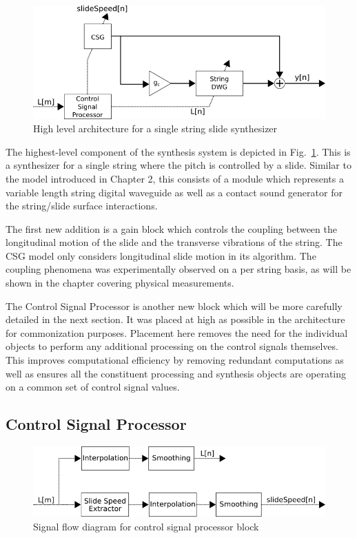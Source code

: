 \documentclass[../main.tex]{subfiles}
\begin{document}
\begin{figure}[h]
    \centering
    \includegraphics[scale=.65]{./images/diagrams/slideSynth.png}
    \caption{High level architecture for a single string slide synthesizer}
    \label{fig:slide_synth}
\end{figure}

The highest-level component of the synthesis system is depicted in Fig.~\ref{fig:slide_synth}. This is a synthesizer for a single string where the pitch is controlled by a slide. Similar to the model introduced in Chapter 2, this consists of a module which represents a variable length string digital waveguide as well as a contact sound generator for the string/slide surface interactions. 

The first new addition is a gain block which controls the coupling between the longitudinal motion of the slide and the transverse vibrations of the string. The CSG model only considers longitudinal slide motion in its algorithm. The coupling phenomena was experimentally observed on a per string basis, as will be shown in the chapter covering physical measurements.

The Control Signal Processor is another new block which will be more carefully detailed in the next section. It was placed at high as possible in the architecture for commonization purposes. Placement here removes the need for the individual objects to perform any additional processing on the control signals themselves. This improves computational efficiency by removing redundant computations as well as ensures all the constituent processing and synthesis objects are operating on a common set of control signal values.

\subsection{Control Signal Processor}

\begin{figure}[h]
    \centering
    \includegraphics[scale=.65]{./images/diagrams/controlSignalProcessor.png}
    \caption{Signal flow diagram for control signal processor block}
    \label{fig:CSP}
\end{figure}
\end{document}
